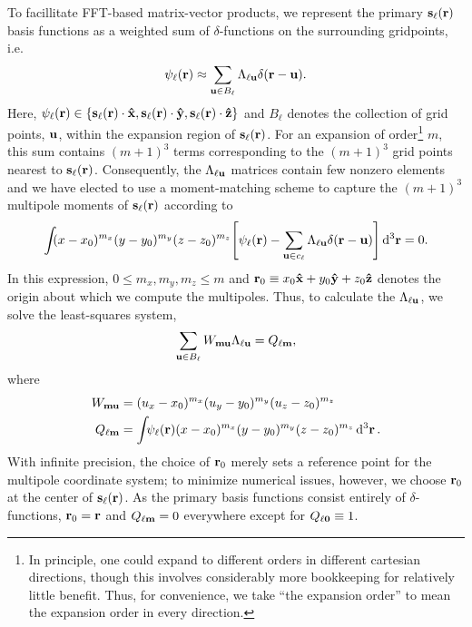 To facillitate FFT-based matrix-vector products, we represent the primary $\vb{s}_\ell(\vb{r})$ basis functions as a weighted sum of $\delta$-functions on the surrounding gridpoints, i.e.
\begin{equation}
  \psi_\ell(\vb{r}) \approx \sum_{\vb{u} \in B_{\ell}} \Lambda_{\ell\vb{u}} \delta(\vb{r} - \vb{u}).
  \label{eq:grid linear combination}
\end{equation}
Here, $\psi_\ell(\vb{r}) \in \qty{\vb{s}_\ell(\vb{r})\cdot \vu{x}, \vb{s}_\ell(\vb{r}) \cdot \vu{y}, \vb{s}_\ell(\vb{r}) \cdot \vu{z}}$ and $B_\ell$ denotes the collection of grid points, $\vb{u}$, within the expansion region of $\vb{s}_\ell(\vb{r})$.
For an expansion of order\footnote{In principle, one could expand to different orders in different cartesian directions, though this involves considerably more bookkeeping for relatively little benefit. Thus, for convenience, we take ``the expansion order'' to mean the expansion order in every direction.} $m$, this sum contains $(m + 1)^3$ terms corresponding to the $(m + 1)^3$ grid points nearest to $\vb{s}_\ell(\vb{r})$.
Consequently, the $\Lambda_{\ell \vb{u}}$ matrices contain few nonzero elements and we have elected to use a moment-matching scheme to capture the $(m + 1)^3$ multipole moments of $\vb{s}_\ell(\vb{r})$ according to
\begin{equation}
  \int_{} \kern0.1em (x - x_0)^{m_x}(y - y_0)^{m_y}(z - z_0)^{m_z} \qty[\psi_\ell(\vb{r}) - \sum_{\vb{u} \in c_\ell}\Lambda_{\ell\vb{u}}\delta(\vb{r} - \vb{u})] \dd[3]{\vb{r}} = 0.
  \label{eq:moment matching}
\end{equation}
In this expression, $0 \leqslant m_x, m_y, m_z \leqslant m$ and $\vb{r}_0 \equiv x_0 \vu{x} + y_0 \vu{y} + z_0\vu{z}$ denotes the origin about which we compute the multipoles.
Thus, to calculate the $\Lambda_{\ell \vb{u}}$, we solve the least-squares system,
\begin{equation}
  \sum_{\vb{u} \in B_\ell} W_{\vb{m}\vb{u}}\Lambda_{\ell\vb{u}} = Q_{\ell\vb{m}},
  \label{eq:expansion matrix system}
\end{equation}
where
\begin{subequations}
  \begin{align}
    W_{\vb{m}\vb{u}} &= (u_x - x_0)^{m_x} (u_y - y_0)^{m_y} (u_z - z_0)^{m_z} \label{eq:w matrix} \\
    Q_{\ell \vb{m}} &= \int_{} \psi_\ell(\vb{r}) (x - x_0)^{m_x} (y - y_0)^{m_y} (z - z_0)^{m_z} \dd[3]{\vb{r}} \label{eq:q vector}.
  \end{align}
\end{subequations}
With infinite precision, the choice of $\vb{r}_0$ merely sets a reference point for the multipole coordinate system; to minimize numerical issues, however, we choose $\vb{r}_0$ at the center of $\vb{s}_\ell(\vb{r})$.
As the primary basis functions consist entirely of $\delta$-functions, $\vb{r}_0 = \vb{r}$ and $Q_{\ell\vb{m}} = 0$ everywhere except for $Q_{\ell \vb{0}} \equiv 1$.


